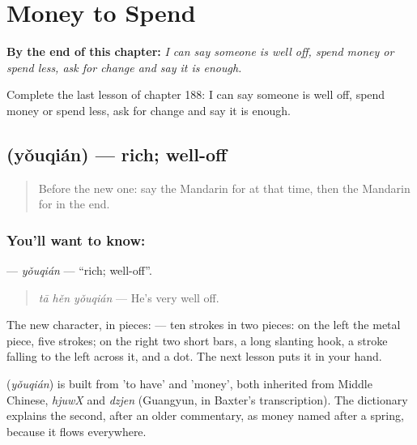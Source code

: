 
\chapter{Money to Spend}
\label{ch:zh-money-to-spend}

\begin{chapteropening}
\textbf{By the end of this chapter:} \emph{I can say someone is well off, spend money or spend less, ask for change and say it is enough.}

Complete the last lesson of chapter 188: I can say someone is well off, spend money or spend less, ask for change and say it is enough.
\end{chapteropening}

\section[\texorpdfstring{\zh{有钱} (yǒuqián)}{有钱 (yǒuqián)}]{ (yǒuqián) — rich; well-off}

\label{lesson:ZH-C188-youqian}



\begin{quote}
Before the new one: say the Mandarin for at that time, then the Mandarin for in the end.
\end{quote}

\subsection*{You'll want to know: }
\textbf{} — \emph{yǒuqián} — \textquotedblleft{}rich; well-off\textquotedblright{}.

\begin{quote}
\textbf{} \emph{tā hěn yǒuqián} — He's very well off.
\end{quote}

The new character, in pieces:  — ten strokes in two pieces: on the left the metal piece, five strokes; on the right two short bars, a long slanting hook, a stroke falling to the left across it, and a dot. The next lesson puts it in your hand.

\begin{cousinweb}
\textbf{} (\emph{yǒuqián}) is built from  'to have' and  'money', both inherited from Middle Chinese, \emph{hjuwX} and \emph{dzjen} (Guangyun, in Baxter's transcription). The dictionary explains the second, after an older commentary, as money named after a spring, because it flows everywhere.
\end{cousinweb}

